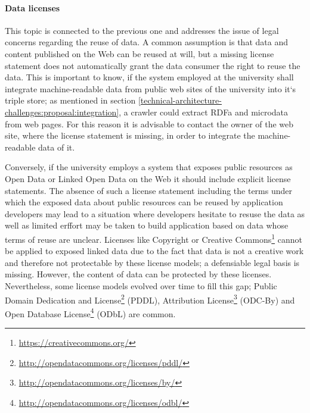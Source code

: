 \documentclass{article}
\begin{document}
\paragraph{Data licenses}
\label{technical-architecture-challenges:challenges:license}
This topic is connected to the previous one and addresses the issue of legal concerns regarding the reuse of data. A common assumption is that data and content published on the Web can be reused at will, but a missing license statement does not automatically grant the data consumer the right to reuse the data. This is important to know, if the system employed at the university shall integrate machine-readable data from public web sites of the university into it`s triple store; as mentioned in section \ref{technical-architecture-challenges:proposal:integration}, a crawler could extract RDFa and microdata from web pages. For this reason it is advisable to contact the owner of the web site, where the license statement is missing, in order to integrate the machine-readable data of it. 

Conversely, if the university employs a system that exposes public resources as Open Data or Linked Open Data on the Web it should include explicit license statements. The absence of such a license statement including the terms under which the exposed data about public resources can be reused by application developers may lead to a situation where developers hesitate to resuse the data as well as limited erffort may be taken to build application based on data whose terms of reuse are unclear. Licenses like Copyright or Creative Commons\footnote{\url{https://creativecommons.org/}} cannot be applied to exposed linked data due to the fact that data is not a creative work and therefore not protectable by these license models; a defensiable legal basis is missing. However, the content of data can be protected by these licenses.\cite{miller_open_2008} Nevertheless, some license models evolved over time to fill this gap; Public Domain Dedication and License\footnote{\url{http://opendatacommons.org/licenses/pddl/}} (PDDL), Attribution License\footnote{\url{http://opendatacommons.org/licenses/by/}} (ODC-By) and Open Database License\footnote{\url{http://opendatacommons.org/licenses/odbl/}} (ODbL) are common.
\end{document}
